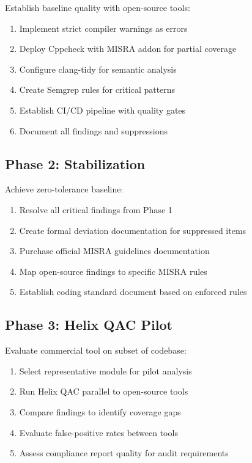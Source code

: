 \documentclass[11pt,letterpaper]{report}
\begin{document}
Establish baseline quality with open-source tools:

\begin{enumerate}[leftmargin=*]
    \item Implement strict compiler warnings as errors
    \item Deploy Cppcheck with MISRA addon for partial coverage
    \item Configure clang-tidy for semantic analysis
    \item Create Semgrep rules for critical patterns
    \item Establish CI/CD pipeline with quality gates
    \item Document all findings and suppressions
\end{enumerate}

\subsection{Phase 2: Stabilization}

Achieve zero-tolerance baseline:

\begin{enumerate}[leftmargin=*]
    \item Resolve all critical findings from Phase 1
    \item Create formal deviation documentation for suppressed items
    \item Purchase official MISRA guidelines documentation
    \item Map open-source findings to specific MISRA rules
    \item Establish coding standard document based on enforced rules
\end{enumerate}

\subsection{Phase 3: Helix QAC Pilot}

Evaluate commercial tool on subset of codebase:

\begin{enumerate}[leftmargin=*]
    \item Select representative module for pilot analysis
    \item Run Helix QAC parallel to open-source tools
    \item Compare findings to identify coverage gaps
    \item Evaluate false-positive rates between tools
    \item Assess compliance report quality for audit requirements
\end{enumerate}
\end{document}
